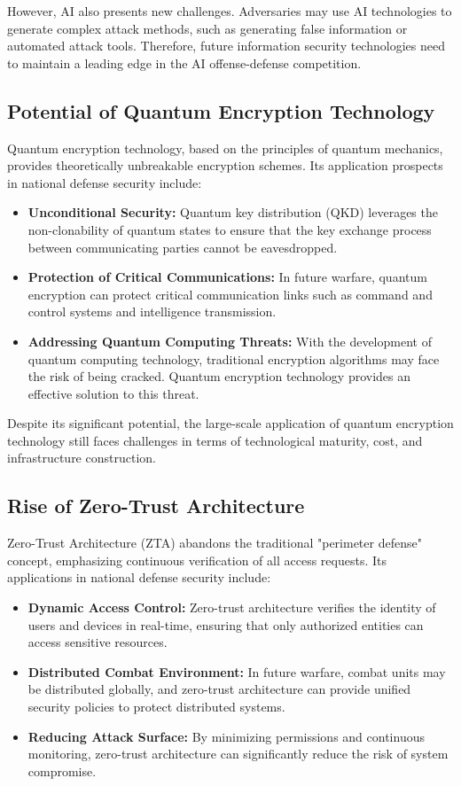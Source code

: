 \documentclass[12pt, a4paper]{article}
\begin{document}
However, AI also presents new challenges. Adversaries may use AI technologies to generate complex attack methods, such as generating false information or automated attack tools. Therefore, future information security technologies need to maintain a leading edge in the AI offense-defense competition.

\subsection{Potential of Quantum Encryption Technology}
Quantum encryption technology, based on the principles of quantum mechanics, provides theoretically unbreakable encryption schemes. Its application prospects in national defense security include:

\begin{itemize}
    \item \textbf{Unconditional Security:} Quantum key distribution (QKD) leverages the non-clonability of quantum states to ensure that the key exchange process between communicating parties cannot be eavesdropped.
    \item \textbf{Protection of Critical Communications:} In future warfare, quantum encryption can protect critical communication links such as command and control systems and intelligence transmission.
    \item \textbf{Addressing Quantum Computing Threats:} With the development of quantum computing technology, traditional encryption algorithms may face the risk of being cracked. Quantum encryption technology provides an effective solution to this threat.
\end{itemize}

Despite its significant potential, the large-scale application of quantum encryption technology still faces challenges in terms of technological maturity, cost, and infrastructure construction.

\subsection{Rise of Zero-Trust Architecture}
Zero-Trust Architecture (ZTA) abandons the traditional "perimeter defense" concept, emphasizing continuous verification of all access requests. Its applications in national defense security include:

\begin{itemize}
    \item \textbf{Dynamic Access Control:} Zero-trust architecture verifies the identity of users and devices in real-time, ensuring that only authorized entities can access sensitive resources.
    \item \textbf{Distributed Combat Environment:} In future warfare, combat units may be distributed globally, and zero-trust architecture can provide unified security policies to protect distributed systems.
    \item \textbf{Reducing Attack Surface:} By minimizing permissions and continuous monitoring, zero-trust architecture can significantly reduce the risk of system compromise.
\end{itemize}
\end{document}
